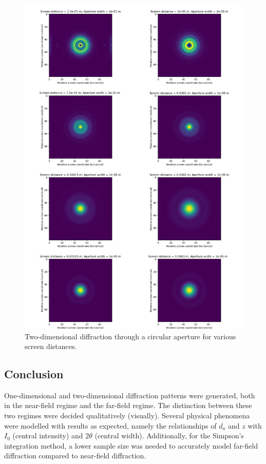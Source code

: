 \documentclass[hyphens,twocolumn,nobalancelastpage,aps,10pt,citeautoscript,longbibliography]{revtex4-2}
\begin{document}
\begin{figure}[htpb] \centering
	\includegraphics[width=1\linewidth]{./assets/circular_apertures/combined.png}
	\caption{Two-dimensional diffraction through a circular aperture for various screen distances.}%
	\label{fig:circ_ap}
\end{figure}

\subsection{Conclusion}%
\label{sub:conclusion_1}

\noindent One-dimensional and two-dimensional diffraction patterns were
generated, both in the near-field regime and the far-field regime. The
distinction between these two regimes were decided qualitatively (visually).
Several physical phenomena were modelled with results as expected, namely the
relationships of $d_a$ and $z$ with $I_0$ (central intensity) and $2\theta$
(central width). Additionally, for the Simpson's integration method, a lower
sample size was needed to accurately model far-field diffraction compared to
near-field diffraction.
\end{document}
